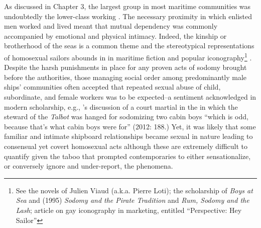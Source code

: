 As discussed in Chapter 3, the largest group in most maritime communities was undoubtedly the lower-class working . The necessary proximity in which enlisted men worked and lived meant that mutual dependency was commonly accompanied by emotional and physical intimacy. Indeed, the kinship or brotherhood of the seas is a common theme and the stereotypical representations of homosexual sailors abounds in in maritime fiction and popular iconography\footnote{See the novels of Julien Viaud (a.k.a. Pierre Loti); the scholarship of  \textit{Boys at Sea} and (1995) \textit{Sodomy and the Pirate Tradition} and  \textit{Rum, Sodomy and the Lash};  article on gay iconography in marketing, entitled “Perspective: Hey Sailor”} . Despite the harsh punishments in place for any proven acts of sodomy brought before the authorities, those managing social order among predominantly male ships’ communities often accepted that repeated sexual abuse of child, subordinate, and female workers was to be expected--a sentiment acknowledged in modern scholarship, e.g., \citeauthor{Bicheno2012}’s discussion of a court martial in the  in which the steward of the \textit{Talbot} was hanged for sodomizing two cabin boys “which is odd, because that’s what cabin boys were for” (2012: 188.) Yet, it was likely that some familiar and intimate shipboard relationships became sexual in nature leading to consensual yet covert homosexual acts although these are extremely difficult to quantify given the taboo that prompted contemporaries to either sensationalize, or conversely ignore and under-report, the phenomena. 

